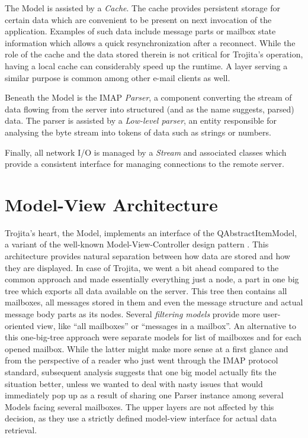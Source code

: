 \documentclass[12pt,notitlepage]{report}
\newcommand{\trojita}{Trojita\xspace}
\begin{document}
The Model is assisted by a {\em Cache}.  The cache provides persistent storage
for certain data which are convenient to be present on next invocation of the
application.  Examples of such data include message parts or mailbox state
information which allows a quick resynchronization after a reconnect.  While the
role of the cache and the data stored therein is not critical for \trojita's
operation, having a local cache can considerably speed up the runtime.  A layer
serving a similar purpose is common among other e-mail clients as well.

Beneath the Model is the IMAP {\em Parser}, a component converting the stream of
data flowing from the server into structured (and as the name suggests, parsed)
data.  The parser is assisted by a {\em Low-level parser}, an entity responsible
for analysing the byte stream into tokens of data such as strings or numbers.

Finally, all network I/O is managed by a {\em Stream} and associated classes
which provide a consistent interface for managing connections to the remote
server.

\section{Model-View Architecture}
\label{big-tree}

\trojita's heart, the Model, implements an interface of the QAbstractItemModel,
a variant of the well-known Model-View-Controller design pattern \cite{GoF}.
This architecture provides natural separation between how data are stored and
how they are displayed.  In case of \trojita, we went a bit ahead compared to
the common approach and made essentially everything just a node, a part in one
big tree which exports all data available on the server.  This tree then
contains all mailboxes, all messages stored in them and even the message
structure and actual message body parts as its nodes. Several {\em filtering
models} provide more user-oriented view, like ``all mailboxes'' or ``messages in
a mailbox''.  An alternative to this one-big-tree approach were separate models
for list of mailboxes and for each opened mailbox.  While the latter might make
more sense at a first glance and from the perspective of a reader who just went
through the IMAP protocol standard, subsequent analysis suggests that one big
model actually fits the situation better, unless we wanted to deal with nasty
issues that would immediately pop up as a result of sharing one Parser instance
among several Models facing several mailboxes.  The upper layers are not
affected by this decision, as they use a strictly defined model-view interface
for actual data retrieval.
\end{document}
